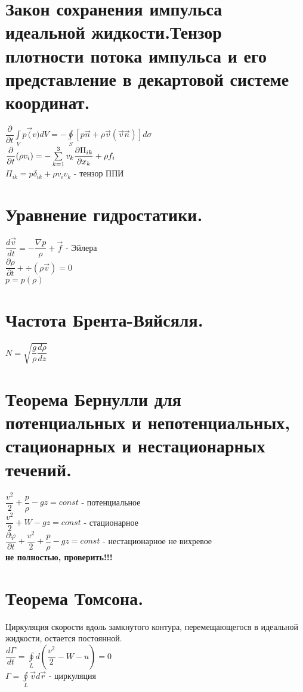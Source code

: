 \begin{multicols*}{4}
		\section{Закон сохранения импульса идеальной жидкости.Тензор плотности потока импульса и его представление в декартовой системе координат.}
		$ \dfrac{\partial}{\partial t}\int\limits_V p\vec(v)dV=-\oint\limits_S \left[p\vec{n}+\rho\vec{v}(\vec{v}\vec{n})\right]d\sigma$ \\
		$ \dfrac{\partial}{\partial t}(\rho v_i)=-\sum\limits_{k=1}^3v_k\dfrac{\partial \Pi_{ik}}{\partial x_k}+\rho f_i $ \\
		$ \Pi_{ik} = p\delta_{ik}+\rho v_iv_k$ - тензор ППИ
		
		\section{Уравнение гидростатики.}
		$\dfrac{d\vec{v}}{dt}=-\dfrac{\nabla p}{\rho}+\vec{f}$ - Эйлера\\
		$\dfrac{\partial\rho}{\partial t}+\div(\rho\vec{v})=0$ \\
		$p=p(\rho)$
		
		\section{Частота Брента-Вяйсяля.}
		$N=\sqrt{\dfrac{g}{\rho}\dfrac{d\rho}{dz}}$
		
		\section{Теорема Бернулли для потенциальных и непотенциальных, стационарных и нестационарных течений.}
		$\dfrac{v^2}{2}+\dfrac{p}{\rho}-gz=const$ - потенциальное \\
		$\dfrac{v^2}{2}+W-gz=const$ - стационарное \\
		$\dfrac{\partial \varphi}{\partial t}+\dfrac{v^2}{2}+\dfrac{p}{\rho}-gz=const$ - нестационарное не вихревое \\
		\textbf{не полностью, проверить!!!}
		
		\section{Теорема Томсона.}
		Циркуляция скорости вдоль замкнутого контура, перемещающегося в идеальной жидкости, остается постоянной. \\
		$\dfrac{d\Gamma}{dt}=\oint\limits_Ld\left(\dfrac{v^2}{2}-W-u\right)=0$ \\
		$\Gamma = \oint\limits_L\vec{v}d\vec{r}$ - циркуляция
		

\end{multicols*}
